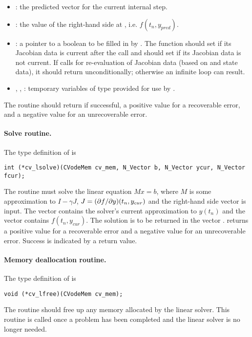 \begin{itemize}
\item {}: the predicted  vector for the current {\cvode} internal   
  step.                                                   
  
\item {}: the value of the right-hand side at , 
  i.e. $f(t_n, y_{pred})$.
  
\item {}: a pointer to a boolean to be filled in by .  
  The function should set  if its Jacobian 
  data is current after the call and should set         
   if its Jacobian data is not current.   
  If  calls for re-evaluation of         
  Jacobian data (based on  and {\cvode} state      
  data), it should return  unconditionally;
  otherwise an infinite loop can result.                
  
\item {}, , : 
  temporary variables of type  provided for use by .      
  
\end{itemize}

The  routine should return  if successful,            
a positive value for a recoverable error, and a negative value  
for an unrecoverable error.  

\paragraph{Solve routine.}
The type definition of  is
\begin{verbatim}
int (*cv_lsolve)(CVodeMem cv_mem, N_Vector b, N_Vector ycur, N_Vector fcur);  
\end{verbatim}
The routine  must solve the linear equation $M x = b$, where         
$M$ is some approximation to $I - \gamma J$, $J = (\partial f / \partial y)(t_n, y_{cur})$  
and the right-hand side vector  is input. The vector 
contains the solver's current approximation to $y(t_n)$ and the vector      
 contains $f(t_n,y_{cur})$. The solution is to be    
returned in the vector .  returns a positive value    
for a recoverable error and a negative value for an             
unrecoverable error. Success is indicated by a  return value.

\paragraph{Memory deallocation routine.}
The type definition of  is
\begin{verbatim}
void (*cv_lfree)(CVodeMem cv_mem);
\end{verbatim}
The routine  should free up any memory allocated by the linear
solver. This routine is called once a problem has been completed and the 
linear solver is no longer needed.
